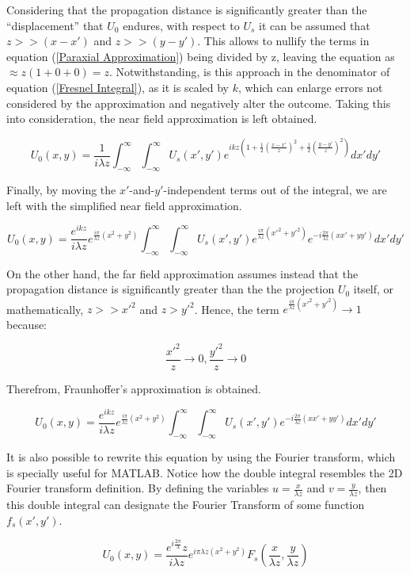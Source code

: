 Considering that the propagation distance is significantly greater than the ``displacement'' that $U_0$ endures, with respect to $U_s$ it can be assumed that $z >> (x-x')$ and $z >> (y-y')$. This allows to nullify the terms in equation (\ref{Paraxial Approximation}) being divided by z, leaving the equation as $\approx z(1+0+0) = z$. Notwithstanding, is this approach in the denominator of equation (\ref{Fresnel Integral}), as it is scaled by $k$, which can enlarge errors not considered by the approximation and negatively alter the outcome. Taking this into consideration, the near field approximation is left obtained.

\begin{equation}
    U_0(x,y) = \frac{1}{i\lambda z}\int_{-\infty}^{\infty}\int_{-\infty}^{\infty}U_s(x',y')e^{ikz \left( 1 + \frac{1}{2} \left( \frac{x - x'}{z} \right)^2 + \frac{1}{2} \left( \frac{y - y'}{z} \right)^2 \right)}dx'dy'
\end{equation}

Finally, by moving the $x'$-and-$y'$-independent terms out of the integral, we are left with the simplified near field approximation.

\begin{equation}
    U_0(x,y) = \frac{e^{ikz}}{i\lambda z}e^{\frac{i\pi}{\lambda z}(x^2+y^2)}\int_{-\infty}^{\infty}\int_{-\infty}^{\infty}U_s(x',y')e^{\frac{i\pi}{\lambda z}(x'^2+y'^2)}e^{-i\frac{2\pi}{\lambda z} (xx'+yy')}dx'dy'
    \label{Near Field Approximation}
\end{equation}

On the other hand, the far field approximation assumes instead that the propagation distance is significantly greater than the the projection $U_0$ itself, or mathematically, $z >> x'^2$ and $z > y'^2$. Hence, the term $e^{\frac{i\pi}{\lambda z}(x'^2+y'^2)} \rightarrow 1$ because:

\begin{equation}
    \frac{x'^2}{z} \rightarrow 0, \frac{y'^2}{z} \rightarrow 0
\end{equation}

Therefrom, Fraunhoffer's approximation is obtained.

\begin{equation}
    U_0(x,y) = \frac{e^{ikz}}{i\lambda z}e^{\frac{i\pi}{\lambda z}(x^2+y^2)}\int_{-\infty}^{\infty}\int_{-\infty}^{\infty}U_s(x',y')e^{-i\frac{2\pi}{\lambda z} (xx'+yy')}dx'dy'
    \label{Far Field Approximation}
\end{equation}

\newpage
It is also possible to rewrite this equation by using the Fourier transform, which is specially useful for MATLAB. Notice how the double integral resembles the 2D Fourier transform definition. By defining the variables $u = \frac{x}{\lambda z}$ and $v = \frac{y}{\lambda z}$, then this double integral can designate the Fourier Transform of some function $f_s(x',y')$.

\begin{equation}
    U_0(x,y) = \frac{e^{i\frac{2\pi}{\lambda}}z}{i\lambda z}e^{i\pi \lambda z(x^2+y^2)}F_s(\frac{x}{\lambda z},\frac{y}{\lambda z})
\end{equation}
